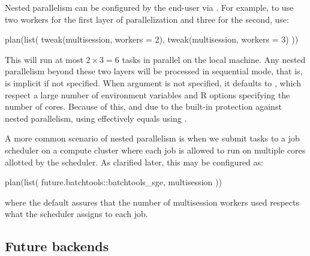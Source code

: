 Nested parallelism can be configured by the end-user
via .  For example, to use two workers for the first
layer of parallelization and three for the second, use:
\begin{example}
plan(list(
  tweak(multisession, workers = 2),
  tweak(multisession, workers = 3)
))
\end{example}
This will run at most $2 \times 3 = 6$ tasks in parallel on the local
machine.  Any nested parallelism beyond these two layers will be
processed in sequential mode, that is,  is
implicit if not specified.  When argument  is not
specified, it defaults to , which
respect a large number of environment variables and R options
specifying the number of cores.  Because of this, and due to the
built-in protection against nested parallelism, using
 effectively equals using
.

A more common scenario of nested parallelism is when we submit tasks
to a job scheduler on a compute cluster where each job is allowed to
run on multiple cores allotted by the scheduler.  As clarified later,
this may be configured as:
\begin{example}
plan(list(
  future.batchtools::batchtools_sge,
  multisession
))
\end{example}
where the default  assures that the
number of multisession workers used respects what the scheduler
assigns to each job.


\subsection{Future backends}
\label{future-backends}

